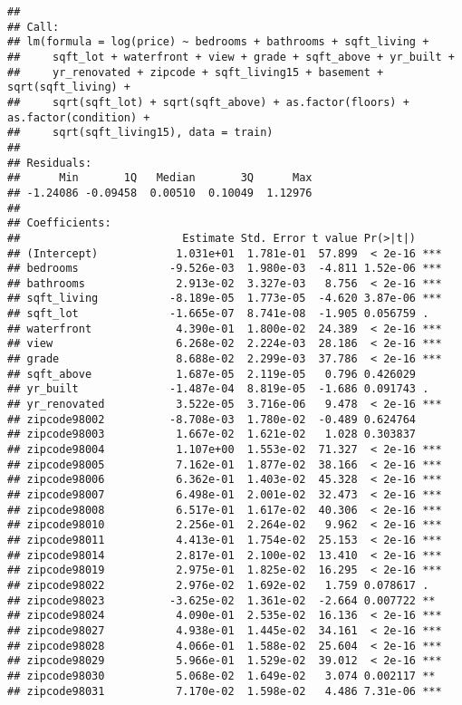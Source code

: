 \documentclass[]{article}
\begin{document}
\begin{verbatim}
## 
## Call:
## lm(formula = log(price) ~ bedrooms + bathrooms + sqft_living + 
##     sqft_lot + waterfront + view + grade + sqft_above + yr_built + 
##     yr_renovated + zipcode + sqft_living15 + basement + sqrt(sqft_living) + 
##     sqrt(sqft_lot) + sqrt(sqft_above) + as.factor(floors) + as.factor(condition) + 
##     sqrt(sqft_living15), data = train)
## 
## Residuals:
##      Min       1Q   Median       3Q      Max 
## -1.24086 -0.09458  0.00510  0.10049  1.12976 
## 
## Coefficients:
##                         Estimate Std. Error t value Pr(>|t|)    
## (Intercept)            1.031e+01  1.781e-01  57.899  < 2e-16 ***
## bedrooms              -9.526e-03  1.980e-03  -4.811 1.52e-06 ***
## bathrooms              2.913e-02  3.327e-03   8.756  < 2e-16 ***
## sqft_living           -8.189e-05  1.773e-05  -4.620 3.87e-06 ***
## sqft_lot              -1.665e-07  8.741e-08  -1.905 0.056759 .  
## waterfront             4.390e-01  1.800e-02  24.389  < 2e-16 ***
## view                   6.268e-02  2.224e-03  28.186  < 2e-16 ***
## grade                  8.688e-02  2.299e-03  37.786  < 2e-16 ***
## sqft_above             1.687e-05  2.119e-05   0.796 0.426029    
## yr_built              -1.487e-04  8.819e-05  -1.686 0.091743 .  
## yr_renovated           3.522e-05  3.716e-06   9.478  < 2e-16 ***
## zipcode98002          -8.708e-03  1.780e-02  -0.489 0.624764    
## zipcode98003           1.667e-02  1.621e-02   1.028 0.303837    
## zipcode98004           1.107e+00  1.553e-02  71.327  < 2e-16 ***
## zipcode98005           7.162e-01  1.877e-02  38.166  < 2e-16 ***
## zipcode98006           6.362e-01  1.403e-02  45.328  < 2e-16 ***
## zipcode98007           6.498e-01  2.001e-02  32.473  < 2e-16 ***
## zipcode98008           6.517e-01  1.617e-02  40.306  < 2e-16 ***
## zipcode98010           2.256e-01  2.264e-02   9.962  < 2e-16 ***
## zipcode98011           4.413e-01  1.754e-02  25.153  < 2e-16 ***
## zipcode98014           2.817e-01  2.100e-02  13.410  < 2e-16 ***
## zipcode98019           2.975e-01  1.825e-02  16.295  < 2e-16 ***
## zipcode98022           2.976e-02  1.692e-02   1.759 0.078617 .  
## zipcode98023          -3.625e-02  1.361e-02  -2.664 0.007722 ** 
## zipcode98024           4.090e-01  2.535e-02  16.136  < 2e-16 ***
## zipcode98027           4.938e-01  1.445e-02  34.161  < 2e-16 ***
## zipcode98028           4.066e-01  1.588e-02  25.604  < 2e-16 ***
## zipcode98029           5.966e-01  1.529e-02  39.012  < 2e-16 ***
## zipcode98030           5.068e-02  1.649e-02   3.074 0.002117 ** 
## zipcode98031           7.170e-02  1.598e-02   4.486 7.31e-06 ***

\end{verbatim}
\end{document}
